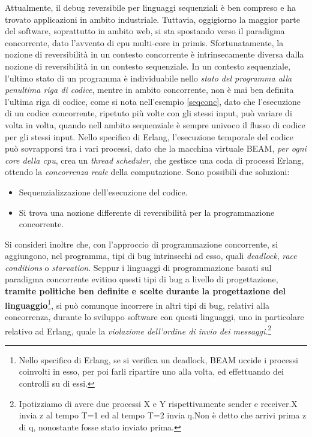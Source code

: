 \documentclass[Tesi.tex]{subfiles}
\begin{document}
Attualmente, il debug reversibile per linguaggi sequenziali è ben compreso e ha trovato applicazioni in ambito industriale.
Tuttavia, oggigiorno la maggior parte del software, soprattutto in ambito web, si sta spostando verso il paradigma concorrente, dato l'avvento di cpu multi-core in primis. Sfortunatamente, la nozione di reversibilità in un contesto concorrente è intrinsecamente diversa dalla nozione di reversibilità in un contesto sequenziale.
In un contesto sequenziale, l'ultimo stato di un programma è individuabile nello \textit{stato del programma alla penultima riga di codice}, mentre in ambito concorrente, non è mai ben definita l'ultima riga di codice, come si nota nell'esempio \ref{seqconc}, dato che l'esecuzione di un codice concorrente, ripetuto più volte con gli stessi input, può variare di volta in volta, quando nell ambito sequenziale è sempre univoco il flusso di codice per gli stessi input.
Nello specifico di Erlang, l'esecuzione temporale del codice può sovrapporsi tra i vari processi, dato che  la macchina virtuale BEAM\cite{smp}, \textit{per ogni core della cpu}, crea un \textit{thread scheduler}, che gestisce una coda di processi Erlang, ottendo la \textit{concorrenza reale} della computazione.
Sono possibili due soluzioni:
\begin{itemize}
	\item Sequenzializzazione dell'esecuzione del codice.
	\item Si trova una nozione differente di reversibilità per la programmazione concorrente. 
\end{itemize}

Si consideri inoltre che, con l'approccio di programmazione concorrente, si aggiungono, nel programma, tipi di bug intrinsechi ad esso, quali \textit{deadlock}, \textit{race conditions} o \textit{starvation}.
Seppur i linguaggi di programmazione basati sul paradigma concorrente evitino questi tipi di bug a livello di progettazione, \textbf{tramite politiche ben definite e scelte durante la progettazione del linguaggio}\footnote{Nello specifico di Erlang, se si verifica un deadlock, BEAM uccide i processi coinvolti in esso, per poi farli ripartire uno alla volta, ed effettuando dei controlli su di essi.}, si può comunque incorrere in altri tipi di bug, relativi alla concorrenza, durante lo sviluppo software con questi linguaggi, uno in particolare relativo ad Erlang, quale la \textit{violazione dell'ordine di invio dei messaggi}.\footnote{Ipotizziamo di avere due processi X e Y rispettivamente sender e receiver.X invia z al tempo T=1 ed al tempo T=2 invia q.Non è detto che arrivi prima z di q, nonostante fosse stato inviato prima.}
\end{document}
